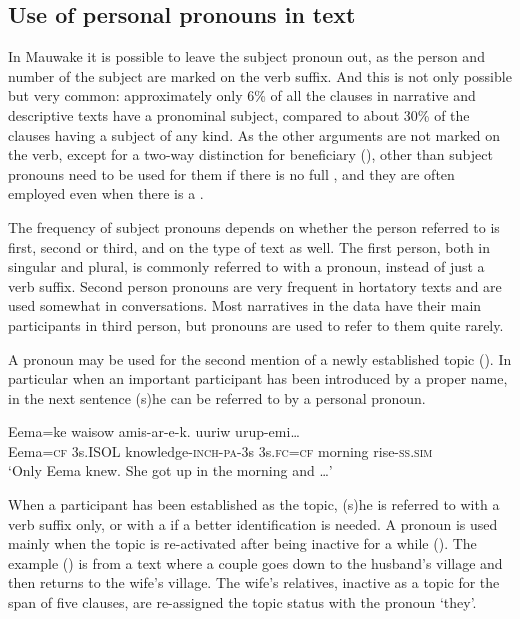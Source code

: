 \subsection{Use of personal pronouns in text}
{}
In Mauwake it is possible to leave the subject pronoun out, as the person and number of the subject are marked on the verb suffix. And this is not only possible but very common: approximately only 6\% of all the clauses in narrative and descriptive texts have a pronominal subject, compared to about 30\% of the clauses having a subject  of any kind. As the other arguments are not marked on the verb, except for a two-way distinction for beneficiary (), other than subject pronouns need to be used for them if there is no full , and they are often employed even when there is a .

The frequency of subject pronouns depends on whether the person referred to is first, second or third, and on the type of text as well. The first person, both in singular and plural, is commonly referred to with a pronoun, instead of just a verb suffix. Second person pronouns are very frequent in hortatory texts and are used somewhat in conversations. Most narratives in the data have their main participants in third person, but pronouns are used to refer to them quite rarely. 

A pronoun may be used for the second mention of a newly established topic (). In particular when an important participant has been introduced by a proper name, in the next sentence (s)he can be referred to by a personal pronoun. 

\ea%
\label{ex:x1867}
\gll Eema=ke waisow amis-ar-e-k.  uuriw urup-emi{\dots}\\
Eema=\textsc{cf} 3s.ISOL knowledge-\textsc{inch}-\textsc{pa}-3s 3s.\textsc{fc}=\textsc{cf} morning rise-\textsc{ss}.\textsc{sim}\\
\glt`Only Eema knew. She got up in the morning and {\dots}'
\z

When a participant has been established as the topic, (s)he is referred to with a verb suffix only, or with a  if a better identification is needed. A pronoun is used mainly when the topic is re-activated after being inactive for a while (). The example () is from a text where a couple goes down to the husband's village and then returns to the wife's village. The wife's relatives, inactive as a topic for the span of five clauses, are re-assigned the topic status with the pronoun  `they'. 

